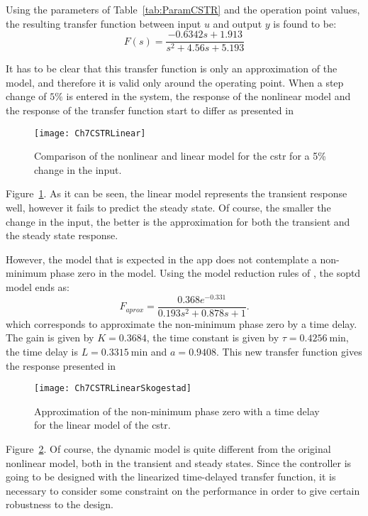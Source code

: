 Using the parameters of Table~\ref{tab:ParamCSTR} and the operation point values, the resulting transfer function between input $u$ and output $y$ is found to be:
\begin{equation}
	F(s) = \frac{-0.6342 s + 1.913}{s^2 + 4.56 s + 5.193}
	\label{eq:TFCSTR}
\end{equation}

It has to be clear that this transfer function is only an approximation of the model, and therefore it is valid only around the operating point. When a step change of $5\%$ is entered in the system, the response of the nonlinear model and the response of the transfer function start to differ as presented in %
%
\begin{figure}[tb]
	\centering
	\texttt{[image: Ch7CSTRLinear]}
	\caption{Comparison of the nonlinear and linear model for the \gls{cstr} for a 5\% change in the input.}
	\label{fig:Ch7CSTRLinear}
\end{figure}
%
Figure~\ref{fig:Ch7CSTRLinear}. As it can be seen, the linear model represents the transient response well, however it fails to predict the steady state. Of course, the smaller the change in the input, the better is the approximation for both the transient and the steady state response.

However, the model that is expected in the \matlab{} app does not contemplate a non-minimum phase zero in the model. Using the model reduction rules of \citet{Skogestad2003}, the \gls{soptd} model ends as:
\begin{equation}
	F_{aprox} = \frac{0.368 e^{-0.331}}{0.193 s^2 + 0.878 s +1}.
	\label{eq:Faprox}
\end{equation}
which corresponds to approximate the non-minimum phase zero by a time delay. The gain is given by $K=0.3684$, the time constant is given by $\tau= \SI{0.4256}{\minute}$, the time delay is $L= \SI{0.3315}{\minute}$ and $a = 0.9408$. This new transfer function gives the response presented in %
\begin{figure}[tb]
	\centering
	\texttt{[image: Ch7CSTRLinearSkogestad]}
	\caption{Approximation of the non-minimum phase zero with a time delay for the linear model of the \gls{cstr}.}
	\label{fig:Ch7CSTRLinearSkogestad}
\end{figure}
%
Figure~\ref{fig:Ch7CSTRLinearSkogestad}. Of course, the dynamic model is quite different from the original nonlinear model, both in the transient and steady states. Since the controller is going to be designed with the linearized time-delayed transfer function, it is necessary to consider some constraint on the performance in order to give certain robustness to the design.

